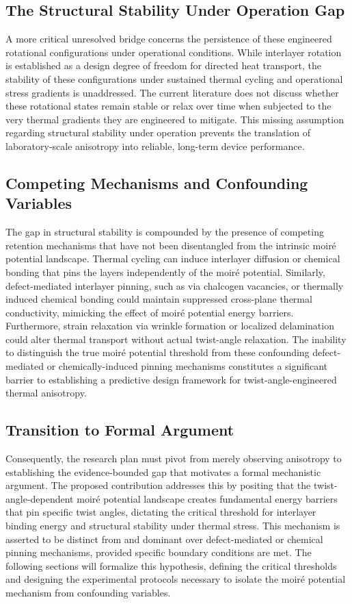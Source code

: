 \documentclass[conference]{IEEEtran}
\begin{document}
\subsection{The Structural Stability Under Operation Gap}
A more critical unresolved bridge concerns the persistence of these engineered rotational configurations under operational conditions. While interlayer rotation is established as a design degree of freedom for directed heat transport, the stability of these configurations under sustained thermal cycling and operational stress gradients is unaddressed. The current literature does not discuss whether these rotational states remain stable or relax over time when subjected to the very thermal gradients they are engineered to mitigate. This missing assumption regarding structural stability under operation prevents the translation of laboratory-scale anisotropy into reliable, long-term device performance.~\cite{cite_26ecaf73d88dfe33}

\subsection{Competing Mechanisms and Confounding Variables}
The gap in structural stability is compounded by the presence of competing retention mechanisms that have not been disentangled from the intrinsic moiré potential landscape. Thermal cycling can induce interlayer diffusion or chemical bonding that pins the layers independently of the moiré potential. Similarly, defect-mediated interlayer pinning, such as via chalcogen vacancies, or thermally induced chemical bonding could maintain suppressed cross-plane thermal conductivity, mimicking the effect of moiré potential energy barriers. Furthermore, strain relaxation via wrinkle formation or localized delamination could alter thermal transport without actual twist-angle relaxation. The inability to distinguish the true moiré potential threshold from these confounding defect-mediated or chemically-induced pinning mechanisms constitutes a significant barrier to establishing a predictive design framework for twist-angle-engineered thermal anisotropy.~\cite{cite_b9cc1fcb55e94349}

\subsection{Transition to Formal Argument}
Consequently, the research plan must pivot from merely observing anisotropy to establishing the evidence-bounded gap that motivates a formal mechanistic argument. The proposed contribution addresses this by positing that the twist-angle-dependent moiré potential landscape creates fundamental energy barriers that pin specific twist angles, dictating the critical threshold for interlayer binding energy and structural stability under thermal stress. This mechanism is asserted to be distinct from and dominant over defect-mediated or chemical pinning mechanisms, provided specific boundary conditions are met. The following sections will formalize this hypothesis, defining the critical thresholds and designing the experimental protocols necessary to isolate the moiré potential mechanism from confounding variables.~\cite{cite_6b49ace365c37cc5}
\end{document}
